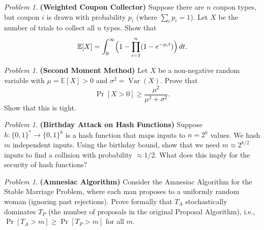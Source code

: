 \documentclass[twoside,12pt]{book}
\theoremstyle{plain}
\theoremstyle{definition}
\theoremstyle{remark}
\newtheorem{problem}[theorem]{Problem}
\begin{document}
\begin{problem}
{\bf (Weighted Coupon Collector)} Suppose there are $n$ coupon types, but coupon $i$ is drawn with probability $p_i$ (where $\sum_i p_i = 1$). Let $X$ be the number of trials to collect all $n$ types. Show that
\[
\mathbb{E}[X] = \int_0^{\infty} \Bigl(1 - \prod_{i=1}^{n}(1 - e^{-p_i t})\Bigr)\, dt.
\]
\end{problem}

\begin{problem}
{\bf (Second Moment Method)} Let $X$ be a non-negative random variable with $\mu = \mathbb{E}[X] > 0$ and $\sigma^2 = \operatorname{Var}(X)$. Prove that
\[
\Pr[X > 0] \geq \frac{\mu^2}{\mu^2 + \sigma^2}.
\]
Show that this is tight.
\end{problem}

\begin{problem}
{\bf (Birthday Attack on Hash Functions)} Suppose $h : \{0,1\}^* \to \{0,1\}^k$ is a hash function that maps inputs to $n = 2^k$ values. We hash $m$ independent inputs. Using the birthday bound, show that we need $m \approx 2^{k/2}$ inputs to find a collision with probability $\approx 1/2$. What does this imply for the security of hash functions?
\end{problem}

\begin{problem}
{\bf (Amnesiac Algorithm)} Consider the Amnesiac Algorithm for the Stable Marriage Problem, where each man proposes to a uniformly random woman (ignoring past rejections). Prove formally that $T_A$ stochastically dominates $T_P$ (the number of proposals in the original Proposal Algorithm), i.e., $\Pr[T_A > m] \geq \Pr[T_P > m]$ for all $m$.
\end{problem}
\end{document}
